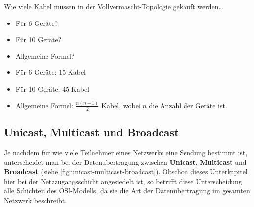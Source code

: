 \begin{myexercise}
	Wie viele Kabel müssen in der Vollvermascht-Topologie gekauft werden\dots
	\begin{itemize}
		\item Für 6 Geräte?
		\item Für 10 Geräte?
		\item Allgemeine Formel?
	\end{itemize}
	\begin{myanswer}
		\begin{itemize}
			\item Für 6 Geräte: 15 Kabel
			\item Für 10 Geräte: 45 Kabel
			\item Allgemeine Formel: $\frac{n(n-1)}{2}$ Kabel, wobei $n$ die Anzahl der Geräte ist.
		\end{itemize}
	\end{myanswer}
\end{myexercise}

\subsection{Unicast, Multicast und Broadcast}
Je nachdem für wie viele Teilnehmer eines Netzwerks eine Sendung bestimmt ist, unterscheidet man bei der Datenübertragung zwischen \textbf{Unicast}, \textbf{Multicast} und \textbf{Broadcast} (siehe \cref{fig:unicast-multicast-broadcast}). Obschon dieses Unterkapitel hier bei der Netzzugangsschicht angesiedelt ist, so betrifft diese Unterscheidung alle Schichten des \gls{OSI}-Modells, da sie die Art der Datenübertragung im gesamten Netzwerk beschreibt.

